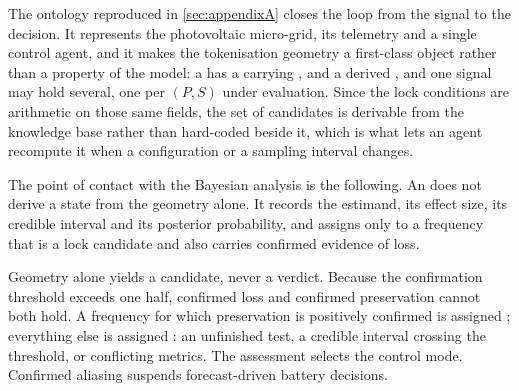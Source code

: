 The ontology reproduced in \autoref{sec:appendixA} closes the loop from the signal to the decision. It represents the photovoltaic micro-grid, its telemetry and a single control agent, and it makes the tokenisation geometry a first-class object rather than a property of the model: a  has a  carrying ,  and a derived , and one signal may hold several, one per $(P,S)$ under evaluation. Since the lock conditions are arithmetic on those same fields, the set of candidates is derivable from the knowledge base rather than hard-coded beside it, which is what lets an agent recompute it when a configuration or a sampling interval changes.

The point of contact with the Bayesian analysis is the following. An  does not derive a state from the geometry alone. It records the estimand, its effect size, its credible interval and its posterior probability, and assigns  only to a frequency that is a lock candidate and also carries confirmed evidence of loss. 

Geometry alone yields a candidate, never a verdict. Because the confirmation threshold exceeds one half, confirmed loss and confirmed preservation cannot both hold. A frequency for which preservation is positively confirmed is assigned ; everything else is assigned : an unfinished test, a credible interval crossing the threshold, or conflicting metrics. The assessment selects the control mode. Confirmed aliasing suspends forecast-driven battery decisions.

